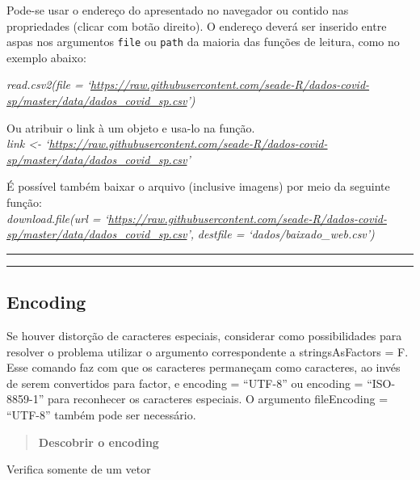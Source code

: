 \documentclass[
]{book}
\newenvironment{Shaded}{\begin{snugshade}}{\end{snugshade}}
\newcommand{\AttributeTok}[1]{\textcolor[rgb]{0.77,0.63,0.00}{#1}}
\newcommand{\DecValTok}[1]{\textcolor[rgb]{0.00,0.00,0.81}{#1}}
\newcommand{\FunctionTok}[1]{\textcolor[rgb]{0.00,0.00,0.00}{#1}}
\newcommand{\NormalTok}[1]{#1}
\newcommand{\SpecialCharTok}[1]{\textcolor[rgb]{0.00,0.00,0.00}{#1}}
\theoremstyle{definition}
\theoremstyle{definition}
\theoremstyle{definition}
\theoremstyle{definition}
\theoremstyle{remark}
\begin{document}
Pode-se usar o endereço do apresentado no navegador ou contido nas propriedades (clicar com botão direito). O endereço deverá ser inserido entre aspas nos argumentos \texttt{file} ou \texttt{path} da maioria das funções de leitura, como no exemplo abaixo:

\emph{read.csv2(file = `\url{https://raw.githubusercontent.com/seade-R/dados-covid-sp/master/data/dados_covid_sp.csv}')}

Ou atribuir o link à um objeto e usa-lo na função.\\
\emph{link \textless- `\url{https://raw.githubusercontent.com/seade-R/dados-covid-sp/master/data/dados_covid_sp.csv}'}

É possível também baixar o arquivo (inclusive imagens) por meio da seguinte função:\\
\emph{download.file(url = `\url{https://raw.githubusercontent.com/seade-R/dados-covid-sp/master/data/dados_covid_sp.csv}',}
\emph{destfile = `dados/baixado\_web.csv')}

\begin{center}\rule{0.5\linewidth}{0.5pt}\end{center}

\begin{center}\rule{0.5\linewidth}{0.5pt}\end{center}

\hypertarget{encoding}{%
\subsection{Encoding}\label{encoding}}

Se houver distorção de caracteres especiais, considerar como possibilidades para resolver o problema utilizar o argumento correspondente a stringsAsFactors = F. Esse comando faz com que os caracteres permaneçam como caracteres, ao invés de serem convertidos para factor, e encoding = ``UTF-8'' ou encoding = ``ISO-8859-1'' para reconhecer os caracteres especiais. O argumento fileEncoding = ``UTF-8'' também pode ser necessário.

\begin{quote}
\textbf{Descobrir o encoding}
\end{quote}

Verifica somente de um vetor

\begin{Shaded}
\end{Shaded}
\end{document}
